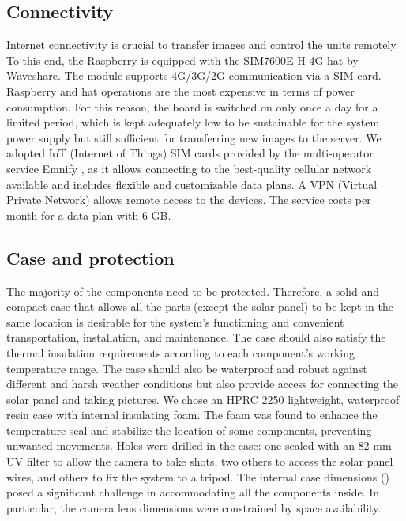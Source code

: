 \subsection{Connectivity}\label{Connectivity}
Internet connectivity is crucial to transfer images and control the units remotely. 
To this end, the Raspberry is equipped with the SIM7600E-H 4G hat by Waveshare.
The module supports 4G/3G/2G communication via a SIM card. Raspberry and hat operations are the most expensive in terms of power consumption. 
For this reason, the board is switched on only
once a day for a limited period, which is kept adequately low to be sustainable for the system power supply but still sufficient for transferring new images to the server. 
We adopted IoT (Internet of Things) SIM cards provided by the multi-operator service Emnify \citep{emnify}, as it allows connecting to the best-quality cellular network available and includes flexible and customizable data plans.
A VPN (Virtual Private Network) allows remote access to the devices.
The service costs  per month for a data plan with 6 GB.

\subsection{Case and protection}\label{Case and protection} 
The majority of the components need to be protected.
Therefore, a solid and compact case that allows all the parts (except the solar panel) to be kept in the same location is desirable for the system's functioning and convenient transportation, installation, and maintenance. 
The case should also satisfy the thermal insulation requirements according to each component's working temperature range. 
The case should also be waterproof and robust against different and harsh weather conditions but also provide access for connecting the solar panel and taking pictures. 
We chose an HPRC 2250 lightweight, waterproof resin case with internal insulating foam.
The foam was found to enhance the temperature seal and stabilize the location of some components, preventing unwanted movements. 
Holes were drilled in the case: one sealed with an 82 mm UV filter to allow the camera to take shots, two others to access the solar panel wires, and others to fix the system to a tripod. 
The internal case dimensions () posed a significant challenge in accommodating all the components inside. 
In particular, the camera lens dimensions were constrained by space availability.

